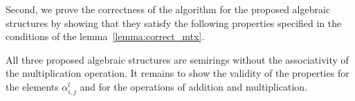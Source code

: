 Second, we prove the correctness of the algorithm for the proposed algebraic structures by showing that they satisfy the following properties specified in the conditions of the lemma~\ref{lemma:correct_mtx}. %
	

All three proposed algebraic structures are semirings without the associativity of the multiplication operation. It remains to show the validity of the properties for the elements $\alpha^l_{i, j}$ and for the operations of addition and multiplication.

